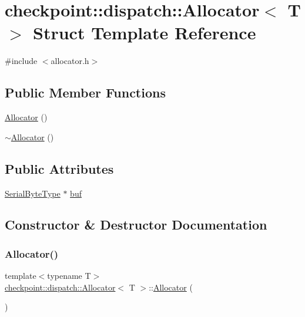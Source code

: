 \hypertarget{structcheckpoint_1_1dispatch_1_1_allocator}{}\section{checkpoint\+:\+:dispatch\+:\+:Allocator$<$ T $>$ Struct Template Reference}
\label{structcheckpoint_1_1dispatch_1_1_allocator}


{\ttfamily \#include $<$allocator.\+h$>$}

\subsection*{Public Member Functions}
\begin{DoxyCompactItemize}
\item 
\hyperlink{structcheckpoint_1_1dispatch_1_1_allocator_a40c8a12993552385721e85ca5b383d90}{Allocator} ()
\item 
\hyperlink{structcheckpoint_1_1dispatch_1_1_allocator_a7048344a23ba3b7bd0fa2ed0123586e5}{$\sim$\+Allocator} ()
\end{DoxyCompactItemize}
\subsection*{Public Attributes}
\begin{DoxyCompactItemize}
\item 
\hyperlink{namespacecheckpoint_ae57f01cdc0b81776c23b6c7c934c58f5}{Serial\+Byte\+Type} $\ast$ \hyperlink{structcheckpoint_1_1dispatch_1_1_allocator_a3d770c2b7a033aff92ba603be5b1027f}{buf}
\end{DoxyCompactItemize}


\subsection{Constructor \& Destructor Documentation}
\mbox{\label{structcheckpoint_1_1dispatch_1_1_allocator_a40c8a12993552385721e85ca5b383d90}} 
\subsubsection{\texorpdfstring{Allocator()}{Allocator()}}
{\footnotesize\ttfamily template$<$typename T$>$ \\
\hyperlink{structcheckpoint_1_1dispatch_1_1_allocator}{checkpoint\+::dispatch\+::\+Allocator}$<$ T $>$\+::\hyperlink{structcheckpoint_1_1dispatch_1_1_allocator}{Allocator} (\begin{DoxyParamCaption}{ }\end{DoxyParamCaption})\hspace{0.3cm}{\ttfamily [inline]}}

